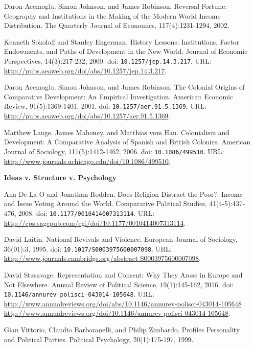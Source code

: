 \documentclass[letterpaper]{article}
\renewenvironment{itemize}{
  \begin{list}{}{
    \setlength{\leftmargin}{1.5em}
  }
}{
  \end{list}
}
\begin{document}
\begin{enumerate}
\begin{itemize}
		\item[$\bullet$] Daron Acemoglu, Simon Johnson, and James Robinson. Reversal Fortune: Geography and Institutions in the Making of the Modern World Income Distribution. The Quarterly Journal of Economics, 117(4):1231-1294, 2002.
		\item[$\bullet$] Kenneth Sokoloff and Stanley Engerman. History Lessons: Institutions, Factor Endowments, and Paths of Development in the New World. Journal of Economic Perspectives, 14(3):217-232, 2000. doi: \texttt{10.1257/jep.14.3.217}. URL: \url{http://pubs.aeaweb.org/doi/abs/10.1257/jep.14.3.217}.
		\item[$\bullet$] Daron Acemoglu, Simon Johnson, and James Robinson. The Colonial Origins of Comparative Development: An Empirical Investigation. American Economic Review, 91(5):1369-1401, 2001. doi: \texttt{10.1257/aer.91.5.1369}. URL: \url{http://pubs.aeaweb.org/doi/abs/10.1257/aer.91.5.1369}.
		\item[$\bullet$] Matthew Lange, James Mahoney, and Matthias vom Hau. Colonialism and Development: A Comparative Analysis of Spanish and British Colonies. American Journal of Sociology, 111(5):1412-1462, 2006. doi: \texttt{10.1086/499510}. URL: \url{http://www.journals.uchicago.edu/doi/10.1086/499510}.
	\end{itemize}
  


\item {\bf Ideas v. Structure v. Psychology}
	\begin{itemize}
		\item[$\bullet$] Ana De La O and Jonathan Rodden. Does Religion Distract the Poor?: Income and Issue Voting Around the World. Comparative Political Studies, 41(4-5):437-476, 2008. doi: \texttt{10.1177/0010414007313114}. URL: \url{http://cps.sagepub.com/cgi/doi/10.1177/0010414007313114}.
		\item[$\bullet$] David Laitin. National Revivals and Violence. European Journal of Sociology, 36(01):3, 1995. doi: \texttt{10.1017/S0003975600007098}. URL: \url{http://www.journals.cambridge.org/abstract S0003975600007098}.
		\item[$\bullet$] David Stasavage. Representation and Consent: Why They Arose in Europe and Not Elsewhere. Annual Review of Political Science, 19(1):145-162, 2016. doi: \texttt{10.1146/annurev-polisci-043014-105648}. URL: \url{http://www.annualreviews.org/doi/abs/10.1146/annurev-polisci-043014-105648 http://www.annualreviews.org/doi/10.1146/annurev-polisci-043014-105648}.
		\item[$\bullet$] Gian Vittorio, Claudio Barbaranelli, and Philip Zimbardo. Profiles Personality and Political Parties. Political Psychology, 20(1):175-197, 1999.


\end{itemize}
\end{enumerate}
\end{document}

